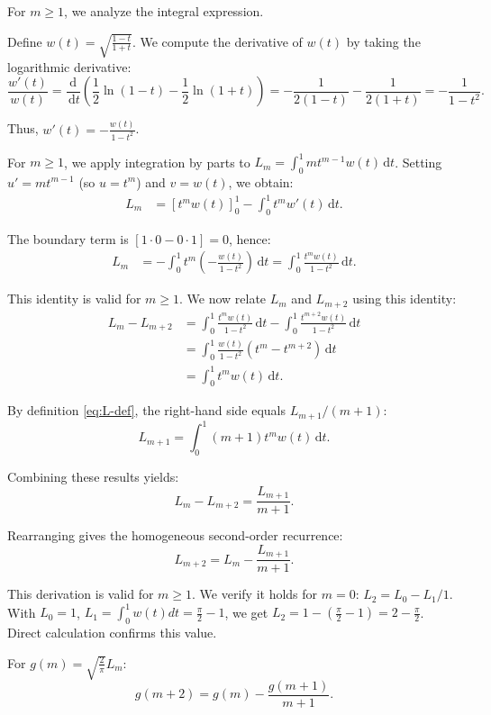 \documentclass[11pt,reqno]{amsart}
\theoremstyle{definition}
\newcommand{\dd}{\mathrm{d}}
\numberwithin{equation}{section}
\begin{document}
For $m \geq 1$, we analyze the integral expression.

Define $w(t) = \sqrt{\frac{1-t}{1+t}}$. We compute the derivative of $w(t)$ by taking the logarithmic derivative:
$$\frac{w'(t)}{w(t)} = \frac{\dd}{\, \dd t} \left(\frac{1}{2}\ln(1-t) - \frac{1}{2}\ln(1+t)\right) = -\frac{1}{2(1-t)} - \frac{1}{2(1+t)} = -\frac{1}{1-t^2}.$$

Thus, $w'(t) = -\frac{w(t)}{1-t^2}$.

For $m \geq 1$, we apply integration by parts to $L_m = \int_0^1 mt^{m-1}w(t)\, \dd t$. Setting $u' = mt^{m-1}$ (so $u=t^m$) and $v = w(t)$, we obtain:
\begin{align*}
L_m &= [t^m w(t)]_0^1 - \int_0^1 t^m w'(t)\, \dd t.
\end{align*}

The boundary term is $[1\cdot 0 - 0\cdot 1] = 0$, hence:
\begin{align*}
L_m &= - \int_0^1 t^m \left(-\frac{w(t)}{1-t^2}\right)\, \dd t = \int_0^1 \frac{t^m w(t)}{1-t^2}\, \dd t.
\end{align*}

This identity is valid for $m \geq 1$. We now relate $L_m$ and $L_{m+2}$ using this identity:
\begin{align*}
L_m - L_{m+2} &= \int_0^1 \frac{t^m w(t)}{1-t^2}\, \dd t - \int_0^1 \frac{t^{m+2} w(t)}{1-t^2}\, \dd t \\
&= \int_0^1 \frac{w(t)}{1-t^2} (t^m - t^{m+2})\, \dd t \\
&= \int_0^1 t^m w(t)\, \dd t.
\end{align*}

By definition \eqref{eq:L-def}, the right-hand side equals $L_{m+1}/(m+1)$:
$$L_{m+1} = \int_0^1 (m+1)t^m w(t)\, \dd t.$$

Combining these results yields:
$$L_m - L_{m+2} = \frac{L_{m+1}}{m+1}.$$

Rearranging gives the homogeneous second-order recurrence:
\begin{equation}\label{eq:L-rec}
L_{m+2} = L_m - \frac{L_{m+1}}{m+1}.
\end{equation}

This derivation is valid for $m \geq 1$. We verify it holds for $m=0$: $L_2 = L_0 - L_1/1$. With $L_0=1$, $L_1 = \int_0^1 w(t)dt = \frac{\pi}{2}-1$, we get $L_2 = 1 - (\frac{\pi}{2}-1) = 2-\frac{\pi}{2}$. Direct calculation confirms this value.

For $g(m) = \sqrt{\frac{2}{\pi}}L_m$:
\begin{equation}\label{eq:g-discrete}
g(m+2) = g(m) - \frac{g(m+1)}{m+1}.
\end{equation}
\end{document}
